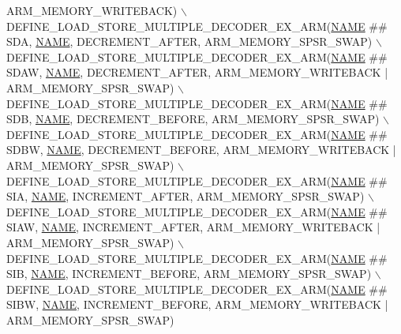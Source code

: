 \begin{DoxyCode}
      ARM\_MEMORY\_WRITEBACK) \(\backslash\)
    DEFINE\_LOAD\_STORE\_MULTIPLE\_DECODER\_EX\_ARM(\mbox{\hyperlink{inflate_8h_a164ea0159d5f0b5f12a646f25f99eceaa67bc2ced260a8e43805d2480a785d312}{NAME}} ## SDA,  \mbox{\hyperlink{inflate_8h_a164ea0159d5f0b5f12a646f25f99eceaa67bc2ced260a8e43805d2480a785d312}{NAME}}, DECREMENT\_AFTER, 
      ARM\_MEMORY\_SPSR\_SWAP) \(\backslash\)
    DEFINE\_LOAD\_STORE\_MULTIPLE\_DECODER\_EX\_ARM(\mbox{\hyperlink{inflate_8h_a164ea0159d5f0b5f12a646f25f99eceaa67bc2ced260a8e43805d2480a785d312}{NAME}} ## SDAW, \mbox{\hyperlink{inflate_8h_a164ea0159d5f0b5f12a646f25f99eceaa67bc2ced260a8e43805d2480a785d312}{NAME}}, DECREMENT\_AFTER, 
      ARM\_MEMORY\_WRITEBACK | ARM\_MEMORY\_SPSR\_SWAP) \(\backslash\)
    DEFINE\_LOAD\_STORE\_MULTIPLE\_DECODER\_EX\_ARM(\mbox{\hyperlink{inflate_8h_a164ea0159d5f0b5f12a646f25f99eceaa67bc2ced260a8e43805d2480a785d312}{NAME}} ## SDB,  \mbox{\hyperlink{inflate_8h_a164ea0159d5f0b5f12a646f25f99eceaa67bc2ced260a8e43805d2480a785d312}{NAME}}, DECREMENT\_BEFORE, 
      ARM\_MEMORY\_SPSR\_SWAP) \(\backslash\)
    DEFINE\_LOAD\_STORE\_MULTIPLE\_DECODER\_EX\_ARM(\mbox{\hyperlink{inflate_8h_a164ea0159d5f0b5f12a646f25f99eceaa67bc2ced260a8e43805d2480a785d312}{NAME}} ## SDBW, \mbox{\hyperlink{inflate_8h_a164ea0159d5f0b5f12a646f25f99eceaa67bc2ced260a8e43805d2480a785d312}{NAME}}, DECREMENT\_BEFORE, 
      ARM\_MEMORY\_WRITEBACK | ARM\_MEMORY\_SPSR\_SWAP) \(\backslash\)
    DEFINE\_LOAD\_STORE\_MULTIPLE\_DECODER\_EX\_ARM(\mbox{\hyperlink{inflate_8h_a164ea0159d5f0b5f12a646f25f99eceaa67bc2ced260a8e43805d2480a785d312}{NAME}} ## SIA,  \mbox{\hyperlink{inflate_8h_a164ea0159d5f0b5f12a646f25f99eceaa67bc2ced260a8e43805d2480a785d312}{NAME}}, INCREMENT\_AFTER, 
      ARM\_MEMORY\_SPSR\_SWAP) \(\backslash\)
    DEFINE\_LOAD\_STORE\_MULTIPLE\_DECODER\_EX\_ARM(\mbox{\hyperlink{inflate_8h_a164ea0159d5f0b5f12a646f25f99eceaa67bc2ced260a8e43805d2480a785d312}{NAME}} ## SIAW, \mbox{\hyperlink{inflate_8h_a164ea0159d5f0b5f12a646f25f99eceaa67bc2ced260a8e43805d2480a785d312}{NAME}}, INCREMENT\_AFTER, 
      ARM\_MEMORY\_WRITEBACK | ARM\_MEMORY\_SPSR\_SWAP) \(\backslash\)
    DEFINE\_LOAD\_STORE\_MULTIPLE\_DECODER\_EX\_ARM(\mbox{\hyperlink{inflate_8h_a164ea0159d5f0b5f12a646f25f99eceaa67bc2ced260a8e43805d2480a785d312}{NAME}} ## SIB,  \mbox{\hyperlink{inflate_8h_a164ea0159d5f0b5f12a646f25f99eceaa67bc2ced260a8e43805d2480a785d312}{NAME}}, INCREMENT\_BEFORE, 
      ARM\_MEMORY\_SPSR\_SWAP) \(\backslash\)
    DEFINE\_LOAD\_STORE\_MULTIPLE\_DECODER\_EX\_ARM(\mbox{\hyperlink{inflate_8h_a164ea0159d5f0b5f12a646f25f99eceaa67bc2ced260a8e43805d2480a785d312}{NAME}} ## SIBW, \mbox{\hyperlink{inflate_8h_a164ea0159d5f0b5f12a646f25f99eceaa67bc2ced260a8e43805d2480a785d312}{NAME}}, INCREMENT\_BEFORE, 
      ARM\_MEMORY\_WRITEBACK | ARM\_MEMORY\_SPSR\_SWAP)
\end{DoxyCode}
